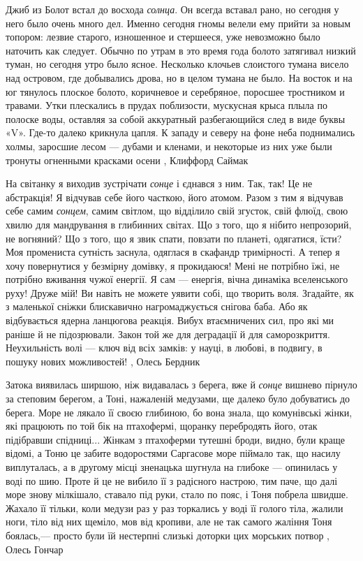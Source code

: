 Джиб из Болот встал до восхода \emph{солнца}. Он всегда вставал рано, но сегодня у
него было очень много дел. Именно сегодня гномы велели ему прийти за новым
топором: лезвие старого, изношенное и стершееся, уже невозможно было наточить
как следует.  Обычно по утрам в это время года болото затягивал низкий туман,
но сегодня утро было ясное. Несколько клочьев слоистого тумана висело над
островом, где добывались дрова, но в целом тумана не было. На восток и на юг
тянулось плоское болото, коричневое и серебряное, поросшее тростником и
травами. Утки плескались в прудах поблизости, мускусная крыса плыла по полоске
воды, оставляя за собой аккуратный разбегающийся след в виде буквы «V». Где-то
далеко крикнула цапля. К западу и северу на фоне неба поднимались холмы,
заросшие лесом — дубами и кленами, и некоторые из них уже были тронуты
огненными красками осени
, Клиффорд Саймак

На світанку я виходив зустрічати \emph{сонце} і єднався з ним. Так, так! Це не
абстракція! Я відчував себе його часткою, його атомом. Разом з тим я відчував
себе самим \emph{сонцем}, самим світлом, що відділило свій згусток, свій флюїд,
свою хвилю для мандрування в глибинних світах. Що з того, що я нібито
непрозорий, не вогняний? Що з того, що я звик спати, повзати по планеті,
одягатися, їсти? Моя промениста сутність заснула, одяглася в скафандр
тримірності. А тепер я хочу повернутися у безмірну домівку, я прокидаюся! Мені
не потрібно їжі, не потрібно вживання чужої енергії. Я сам — енергія, вічна
динаміка вселенського руху!  Друже мій! Ви навіть не можете уявити собі, що
творить воля. Згадайте, як з маленької сніжки блискавично нагромаджується
снігова баба. Або як відбувається ядерна ланцюгова реакція. Вибух втаємничених
сил, про які ми раніше й не підозрювали. Закон той же для деградації й для
саморозкриття. Неухильність волі — ключ від всіх замків: у науці, в любові, в
подвигу, в пошуку нових можливостей!
, Олесь Бердник

Затока виявилась ширшою, ніж видавалась з берега, вже й \emph{сонце} вишнево пірнуло
за степовим берегом, а Тоні, нажаленій медузами, ще далеко було добуватись до
берега. Море не лякало її своєю глибиною, бо вона знала, що комунівські жінки,
які працюють по той бік на птахофермі, щоранку перебродять його, отак
підібравши спідниці... Жінкам з птахоферми тутешні броди, видно, були краще
відомі, а Тоню це забите водоростями Саргасове море піймало так, що насилу
виплуталась, а в другому місці зненацька шугнула на глибоке — опинилась у воді
по шию. Проте й це не вибило її з радісного настрою, тим паче, що далі море
знову мілкішало, ставало під руки, стало по пояс, і Тоня побрела швидше. Жахало
її тільки, коли медузи раз у раз торкались у воді її голого тіла, жалили ноги,
тіло від них щеміло, мов від кропиви, але не так самого жаління Тоня боялась,—
просто були їй нестерпні слизькі доторки цих морських потвор
, Олесь Гончар

